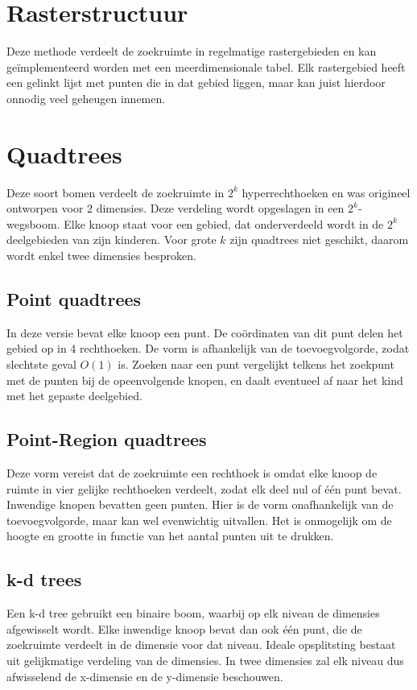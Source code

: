 \documentclass{report}
\begin{document}
\section{Rasterstructuur}
Deze methode verdeelt de zoekruimte in regelmatige rastergebieden en kan geïmplementeerd worden met een meerdimensionale tabel. Elk rastergebied heeft een gelinkt lijst met punten die in dat gebied liggen, maar kan juist hierdoor onnodig veel geheugen innemen.
\section{Quadtrees}
Deze soort bomen verdeelt de zoekruimte in $2^k$ hyperrechthoeken en was origineel ontworpen voor 2 dimensies. Deze verdeling wordt opgeslagen in een $2^k$-wegsboom. Elke knoop staat voor een gebied, dat onderverdeeld wordt in de $2^k$ deelgebieden van zijn kinderen. Voor grote $k$ zijn quadtrees niet geschikt, daarom wordt enkel twee dimensies besproken.
\subsection{Point quadtrees}
In deze versie bevat elke knoop een punt. De coördinaten van dit punt delen het gebied op in 4 rechthoeken. De vorm is afhankelijk van de toevoegvolgorde, zodat slechtste geval $O(1)$ is. Zoeken naar een punt vergelijkt telkens het zoekpunt met de punten bij de opeenvolgende knopen, en daalt eventueel af naar het kind met het gepaste deelgebied.
\subsection{Point-Region quadtrees}
Deze vorm vereist dat de zoekruimte een rechthoek is omdat elke knoop de ruimte in vier gelijke rechthoeken verdeelt, zodat elk deel nul of één punt bevat. Inwendige knopen bevatten geen punten. Hier is de vorm onafhankelijk van de toevoegvolgorde, maar kan wel evenwichtig uitvallen. Het is onmogelijk om de hoogte en grootte in functie van het aantal punten uit te drukken.
\subsection{k-d trees}
Een k-d tree gebruikt een binaire boom, waarbij op elk niveau de dimensies afgewisselt wordt. Elke inwendige knoop bevat dan ook één punt, die de zoekruimte verdeelt in de dimensie voor dat niveau. Ideale opsplitsting bestaat uit gelijkmatige verdeling van de dimensies. In twee dimensies zal elk niveau dus afwisselend de x-dimensie en de y-dimensie beschouwen. 
\end{document}

